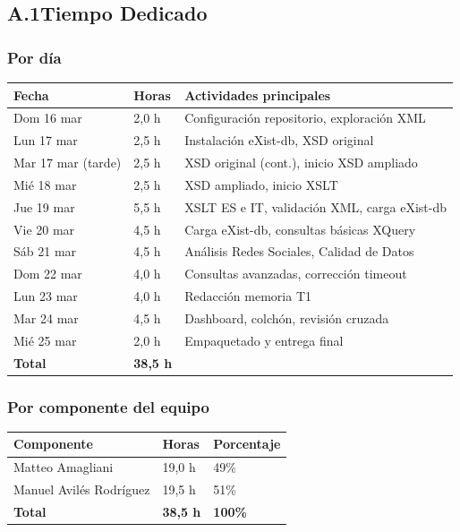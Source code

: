 \documentclass[11pt,a4paper]{article}
\newcommand{\notetitle}[1]{\subsubsection*{#1}}
\begin{document}
\subsection*{A.1\quad Tiempo Dedicado}

\notetitle{Por día}

\begin{center}
\begin{tabular}{L{3cm} C{1.8cm} L{9cm}}
\toprule
\textbf{Fecha} & \textbf{Horas} & \textbf{Actividades principales} \\
\midrule
Dom 16 mar & 2,0 h & Configuración repositorio, exploración XML \\
Lun 17 mar & 2,5 h & Instalación eXist-db, XSD original \\
Mar 17 mar (tarde) & 2,5 h & XSD original (cont.), inicio XSD ampliado \\
Mié 18 mar & 2,5 h & XSD ampliado, inicio XSLT \\
Jue 19 mar & 5,5 h & XSLT ES e IT, validación XML, carga eXist-db \\
Vie 20 mar & 4,5 h & Carga eXist-db, consultas básicas XQuery \\
Sáb 21 mar & 4,5 h & Análisis Redes Sociales, Calidad de Datos \\
Dom 22 mar & 4,0 h & Consultas avanzadas, corrección timeout \\
Lun 23 mar & 4,0 h & Redacción memoria T1 \\
Mar 24 mar & 4,5 h & Dashboard, colchón, revisión cruzada \\
Mié 25 mar & 2,0 h & Empaquetado y entrega final \\
\midrule
{}
\textbf{Total} & \textbf{38,5 h} & \\
\bottomrule
\end{tabular}
\end{center}

\vspace{8pt}
\notetitle{Por componente del equipo}

\begin{center}
\begin{tabular}{L{8cm} C{2.5cm} C{2.5cm}}
\toprule
\textbf{Componente} & \textbf{Horas} & \textbf{Porcentaje} \\
\midrule
Matteo Amagliani & 19,0 h & 49\% \\
Manuel Avilés Rodríguez & 19,5 h & 51\% \\
\midrule
{}
\textbf{Total} & \textbf{38,5 h} & \textbf{100\%} \\
\bottomrule
\end{tabular}
\end{center}
\end{document}
